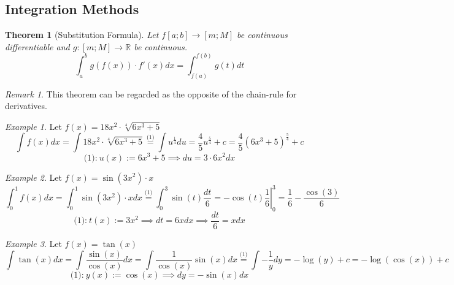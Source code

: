 \documentclass[english,titlepage]{uzhpub}
\theoremstyle{definition}
\theoremstyle{plain}
\newtheorem{theorem}[definition]{Theorem} %
\theoremstyle{remark}
\newtheorem*{remark}{Remark}
\theoremstyle{example}
\newtheorem*{example}{Example}
\begin{document}
   \subsection{Integration Methods}
   \begin{theorem}[Substitution Formula]\label{thm:integral_substitution}
      Let \(f[a;b] \to [m;M]\) be continuous differentiable and \(g: [m;M] \to \mathbb{R}\) be continuous.
      \[\int_a^b g(f(x)) \cdot f'(x) dx = \int_{f(a)}^{f(b)} g(t)dt\]
   \end{theorem}
   \begin{remark}
      This theorem can be regarded as the opposite of the chain-rule for derivatives.
   \end{remark}
   \begin{example}
      Let \(f(x) = 18x^2 \cdot \sqrt[4]{6x^3 + 5}\)
      \[\int f(x) dx = \int 18x^2 \cdot \sqrt[4]{6x^3 + 5} \overset{\text{(1)}}{=} \int u^{\frac{1}{4}} du = \frac{4}{5}u^{\frac{5}{4}} + c = \frac{4}{5}(6x^3 + 5)^{\frac{5}{4}} + c\]
      \[\text{(1):}~u(x) := 6x^3 + 5 \implies du = 3 \cdot 6x^2 dx\]
   \end{example}
   \begin{example}
      Let \(f(x) = \sin(3x^2) \cdot x\)
      \[\int_0^1 f(x) dx = \int_0^1 \sin(3x^2) \cdot xdx \overset{\text{(1)}}{=} \int_0^3 \sin(t) \frac{dt}{6} = \left. -\cos(t) \frac{1}{6}\right|_0^3 = \frac{1}{6} - \frac{\cos(3)}{6}\]
      \[\text{(1):}~t(x) := 3x^2 \implies dt = 6xdx \implies \frac{dt}{6} = xdx\]
   \end{example}
   \begin{example}
      Let \(f(x) = \tan(x)\)
      \[\int \tan(x) dx = \int \frac{\sin(x)}{\cos(x)}dx  = \int \frac{1}{\cos(x)}\sin(x)dx \overset{\text{(1)}}{=} \int -\frac{1}{y} dy = -\log(y) + c = -\log(\cos(x)) + c\]
      \[\text{(1):}~y(x) := \cos(x) \implies dy = -\sin(x)dx\]
   \end{example}
\end{document}
